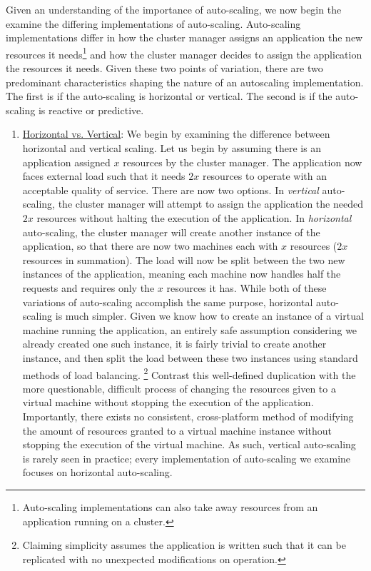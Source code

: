 Given an understanding of the importance of auto-scaling, we now begin the
examine the differing implementations of auto-scaling. Auto-scaling
implementations differ in how the cluster manager assigns an application the new resources it
needs\footnote{Auto-scaling implementations can also take away resources from
an application running on a cluster.} and how the cluster manager decides to
assign the application the resources it needs. Given these two points of
variation, there are two predominant characteristics shaping the nature of an autoscaling
implementation. The first is if the auto-scaling is horizontal or vertical. The
second is if the auto-scaling is reactive or predictive.

\begin{enumerate}
  \item \underline{Horizontal vs. Vertical}: We begin by examining
    the difference between horizontal and vertical scaling.
    Let us begin by assuming there is an application assigned $x$ resources by the
    cluster manager. The application
    now faces external load such that it needs $2x$ resources to operate with an
    acceptable quality of service. There are now two options. In
    \textit{vertical} auto-scaling, the cluster manager will attempt to assign
    the application the needed $2x$ resources
    without halting the execution of the application. In \textit{horizontal}
    auto-scaling, the cluster manager will create another instance of
    the application, so that there are now two machines each with
    $x$ resources ($2x$ resources in summation). The load will now be split between
    the two new instances of the application, meaning each machine now handles half
    the requests and requires only the $x$ resources it has.\cite[pg.
    4]{auto-scaling-techniques-for-elastic-applications-in-cloud-environments} While
    both of these variations of auto-scaling accomplish the same purpose, horizontal
    auto-scaling is much simpler. Given we know how to create an instance of a
    virtual machine running the application, an entirely safe assumption
    considering we already created one such instance, it is fairly trivial to create
    another instance, and then split the load between these two instances using
    standard methods of load balancing. \footnote{Claiming
    simplicity assumes the application is written
    such that it can be replicated with no unexpected modifications
    on operation.} Contrast this well-defined duplication with the more questionable, difficult
    process of changing the resources given to a virtual machine without stopping
    the execution of the application. Importantly, there exists
    no consistent, cross-platform method of
    modifying the amount of resources granted to a virtual machine instance without
    stopping the execution of the virtual machine. As such, vertical auto-scaling is
    rarely seen in practice; every implementation of
    auto-scaling we examine focuses on horizontal auto-scaling.\cite[pg.
    4]{auto-scaling-techniques-for-elastic-applications-in-cloud-environments}


\end{enumerate}
